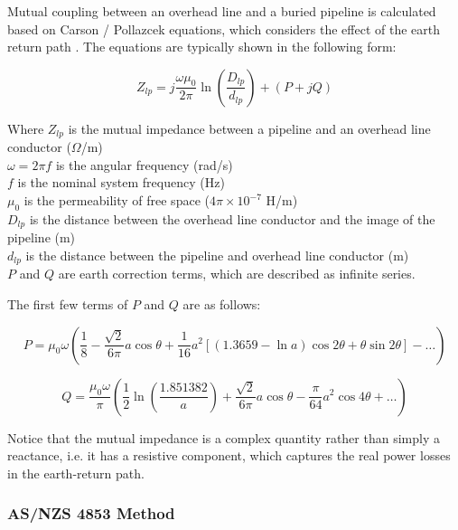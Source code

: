 \documentclass{article}
\begin{document}
Mutual coupling between an overhead line and a buried pipeline is calculated based on Carson / Pollazcek equations, which considers the effect of the earth return path \cite{carson_1926}. The equations are typically shown in the following form:

\begin{equation}
\label{equ:carson}
Z_{lp} = j \frac{\omega \mu_0}{2 \pi} \ln \left( \frac{D_{lp}}{d_{lp}} \right) + (P + j Q)
\end{equation}

Where $Z_{lp}$ is the mutual impedance between a pipeline and an overhead line conductor ($\Omega$/m) \\
\hphantom{Where} $\omega = 2 \pi f$ is the angular frequency (rad/s) \\
\hphantom{Where} $f$ is the nominal system frequency (Hz) \\
\hphantom{Where} $\mu_{0}$ is the permeability of free space ($4\pi \times 10^{-7}$ H/m) \\
\hphantom{Where} $D_{lp}$ is the distance between the overhead line conductor and the image of the pipeline (m) \\
\hphantom{Where} $d_{lp}$ is the distance between the pipeline and overhead line conductor (m) \\
\hphantom{Where} $P$ and $Q$ are earth correction terms, which are described as infinite series.

The first few terms of $P$ and $Q$ are as follows:

\begin{equation}
P = \mu_0 \omega \left( \frac{1}{8} - \frac{\sqrt{2}}{6 \pi}a \cos{\theta} + \frac{1}{16} a^{2} \left[(1.3659 - \ln{a})\cos{2\theta} + \theta \sin{2\theta} \right] - \dots \right)
\end{equation}

\begin{equation}
Q = \frac{\mu_0 \omega}{\pi} \left( \frac{1}{2} \ln{\left( \frac{1.851382}{a} \right)} + \frac{\sqrt{2}}{6 \pi}a \cos{\theta} - \frac{\pi}{64}a^{2} \cos{4\theta} + \dots   \right)
\end{equation}


Notice that the mutual impedance is a complex quantity rather than simply a reactance, i.e. it has a resistive component, which captures the real power losses in the earth-return path. 

\subsubsection{AS/NZS 4853 Method}
\end{document}
